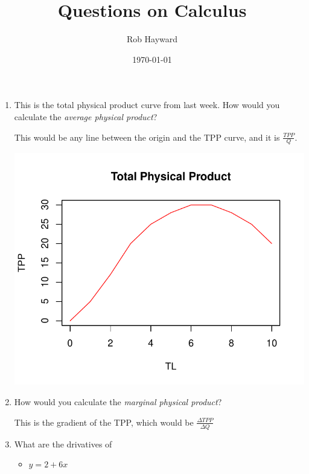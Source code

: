 \documentclass[12pt, a4paper, oneside]{article}\usepackage[]{graphicx}\usepackage[]{color}
\makeatletter
\def\maxwidth{ %
  \ifdim\Gin@nat@width>\linewidth
    \linewidth
  \else
    \Gin@nat@width
  \fi
}
\newenvironment{knitrout}{}{} %
\makeatother
\begin{document}
\title{Questions on Calculus}
\author{Rob Hayward} 
\date{\today}
\maketitle

\doublespacing
\begin{enumerate}
\item This is the total physical product curve from last week.  How would you calculate the \emph{average physical product}? 

This would be any line between the origin and the TPP curve, and it is $\frac{TPP}{Q}$.  

\begin{knitrout}
\color{fgcolor}

{\centering \includegraphics[width=\maxwidth]{figure/plot} 

}



\end{knitrout}

\item How would you calculate the \emph{marginal physical product}?

This is the gradient of the TPP, which would be $\frac{\Delta TPP}{\Delta Q}$

\item What are the drivatives of
\begin{itemize}
\item $y = 2 + 6x$


\end{itemize}
\end{enumerate}
\end{document}
